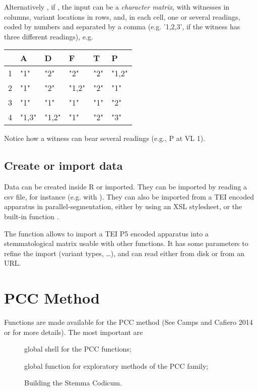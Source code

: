 \documentclass[article,nojss]{jss}
\begin{document}
Alternatively , if , the input can be a \emph{character matrix}, with witnesses in columns, variant locations in rows, and, in each cell, one or several readings, coded by numbers and separated by a comma (e.g. '1,2,3', if the witness has three different readings), e.g.
\begin{table}[!h]
\begin{tabular}{llllll}
 & A & D & F & T & P \\ \hline \hline
1 & "1" & "2" & "2" & "2" & "1,2" \\
2 & "1" & "2" & "1,2" & "2" & "1" \\
3 & "1" & "1" & "1" & "1" & "2" \\
4 & "1,3" & "1,2" & "1" & "2" & "3"
\end{tabular}
\end{table}

Notice how a witness can bear several readings (e.g., P at VL 1).


\subsection{Create or import data}
 
  Data can be created inside R or imported. They can be imported by reading a csv file, for instance (e.g. with ). They can also be imported from a TEI encoded apparatus in parallel-segmentation, either by using an XSL stylesheet, or the built-in function .
  
  The function  allows to import a TEI P5 encoded apparatus into a stemmatological matrix usable with other functions. It has some parameters to refine the import (variant types, …), and can read either from disk or from an URL. 


\section{PCC Method}

    Functions are made available for the PCC method (See Camps and Cafiero 2014 or  for more details). The most important are
\begin{description}
\item[] global shell for the PCC functions;
\item[] global function for exploratory methods of the PCC family;
\item[] Building the Stemma Codicum.
\end{description}
\end{document}

